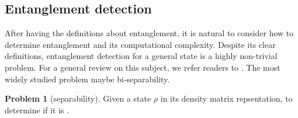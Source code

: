 \documentclass[
reprint,
aps,
pra,
floatfix,
]{revtex4-2}
\theoremstyle{plain}
\theoremstyle{definition}
\newtheorem{problem}{Problem}
\newtheorem{remark}{Remark}
\newcommand{\dm}{\rho}
\begin{document}





\subsection{Entanglement detection}
After having the definitions about entanglement, 
it is natural to consider how to determine entanglement and its computational complexity.
Despite its clear definitions, entanglement detection for a general state is a highly non-trivial problem.
For a general review on this subject, we refer readers to \cite{guhneEntanglementDetection2009}.
The most widely studied problem maybe bi-separability.
\begin{problem}[separability]\label{prm:separability}
	Given a state $\dm$ in its density matrix repsentation, to determine if it is .
\end{problem}
\end{document}
